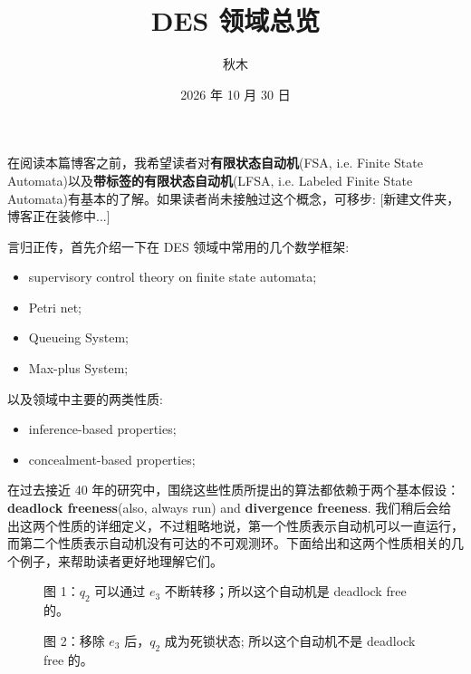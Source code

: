 \documentclass[11pt,a4paper]{ctexart}
\title{DES 领域总览}
\author{秋木}
\date{2026 年 10 月 30 日}
\begin{document}
\maketitle

在阅读本篇博客之前，我希望读者对\textbf{有限状态自动机}(FSA, i.e. Finite State Automata)以及\textbf{带标签的有限状态自动机}(LFSA, i.e. Labeled Finite State Automata)有基本的了解。如果读者尚未接触过这个概念，可移步: [新建文件夹，博客正在装修中...]

言归正传，首先介绍一下在 DES 领域中常用的几个数学框架:
\begin{itemize}
  \item supervisory control theory on finite state automata;
  \item Petri net;
  \item Queueing System;
  \item Max-plus System;
\end{itemize}

以及领域中主要的两类性质:
\begin{itemize}
  \item inference-based properties;
  \item concealment-based properties;
\end{itemize}

在过去接近 40 年的研究中，围绕这些性质所提出的算法都依赖于两个基本假设：\textbf{deadlock freeness}(also, always run) and \textbf{divergence freeness}. 我们稍后会给出这两个性质的详细定义，不过粗略地说，第一个性质表示自动机可以一直运行，而第二个性质表示自动机没有可达的不可观测环。下面给出和这两个性质相关的几个例子，来帮助读者更好地理解它们。

\begin{figure}[H]
\centering
{}
\caption{图 1：$q_2$ 可以通过 $e_3$ 不断转移；所以这个自动机是 deadlock free 的。}
\end{figure}

\begin{figure}[H]
\centering
{}
\caption{图 2：移除 $e_3$ 后，$q_2$ 成为死锁状态; 所以这个自动机不是 deadlock free 的。}
\end{figure}
\end{document}
